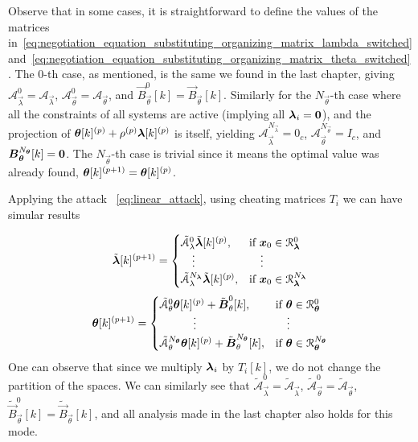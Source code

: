 \documentclass[../main.tex]{subfiles}
\begin{document}
Observe that in some cases, it is straightforward to define the values of the matrices in~\eqref{eq:negotiation_equation_substituting_organizing_matrix_lambda_switched} and~\eqref{eq:negotiation_equation_substituting_organizing_matrix_theta_switched}.
The $0$-th case, as mentioned, is the same we found in the last chapter, giving
$\mathcal{A}_{\vec{\lambda}}^{0}=\mathcal{A}_{\vec{\lambda}}$,
$\mathcal{A}_{\vec{\theta}}^{0}=\mathcal{A}_{\vec{\theta}}$, and
$\vec{B}_{\vec{\theta}}^{0}[k]=\vec{B}_{\vec{\theta}}[k]$.
Similarly for the $N_{\vec{\theta}}$-th case where all the constraints of all systems are active (implying all $\boldsymbol{\lambda}_{i}=\mathbf{0}$), and the projection of $\boldsymbol{\theta}[k]^{(p)}+\rho^{(p)}\boldsymbol{\lambda}[k]^{(p)}$ is itself, yielding
$\mathcal{A}_{\vec{\lambda}}^{N_{\vec{\lambda}}}=0_{c}$,
$\mathcal{A}_{\vec{\theta}}^{N_{\vec{\theta}}}=I_{c}$, and
$\boldsymbol{B}_{\boldsymbol{\theta}}^{N_{\boldsymbol{\theta}}}[k]=\mathbf{0}$.
The $N_{\vec{\theta}}$-th case is trivial since it means the optimal value was already found, $\boldsymbol{\theta}[k]^{(p+1)}=\boldsymbol{\theta}[k]^{(p)}$.

Applying the attack ~\eqref{eq:linear_attack}, using cheating matrices $T_{i}$ we can have simular results

\begin{equation}
  \label{eq:negotiation_equation_substituting_organizing_matrix_lambda_switched_cheating}
  \tilde{\vec{\lambda}}[k]\pplusone=
  \begin{cases}
    \tilde{\mathcal{A}}_{\lambda}^{0}\tilde{\vec{\lambda}}[k]\p,&\text{if}\ \vec{x}_{0}\in\set{R}_{\vec{\lambda}}^{0}\\
    \quad\vdots&\quad\vdots\\
    \tilde{\mathcal{A}}_{\lambda}^{N_{\vec{\lambda}}}\tilde{\vec{\lambda}}[k]\p,&\text{if}\ \vec{x}_{0}\in\set{R}_{\vec{\lambda}}^{N_{\vec{\lambda}}}\\
  \end{cases}
\end{equation}
\begin{equation}
  \label{eq:negotiation_equation_substituting_organizing_matrix_theta_switched_cheating}
  \vec{\theta}[k]\pplusone=
  \begin{cases}
    \tilde{\mathcal{A}}_{\theta}^{0}\vec{\theta}[k]\p+\mathcal{\tilde{\vec{B}}}_{\theta}^{0}[k],&\text{if}\ \vec{\theta}\in\set{R}_{\vec{\theta}}^{0}\\
    \qquad\quad \vdots&\quad \vdots\\
    \tilde{\mathcal{A}}_{\theta}^{N_{\vec{\theta}}}\vec{\theta}[k]\p+\mathcal{\tilde{\vec{B}}}_{\theta}^{N_{\vec{\theta}}}[k],&\text{if}\ \vec{\theta}\in\set{R}_{\vec{\theta}}^{N_{\vec{\theta}}}\\
  \end{cases}
\end{equation}
One can observe that since we multiply $\boldsymbol{\lambda}_{i}$ by $T_{i}[k]$, we do not change the partition of the spaces.
We can similarly see that
$\tilde{\mathcal{A}}_{\vec{\lambda}}^{0}=\tilde{\mathcal{A}}_{\vec{\lambda}}$,
$\tilde{\mathcal{A}}_{\vec{\theta}}^{0}=\tilde{\mathcal{A}}_{\vec{\theta}}$,
$\tilde{\vec{B}}_{\vec{\theta}}^{0}[k]=\tilde{\vec{B}}_{\vec{\theta}}[k]$, and all analysis made in the last chapter also holds for this mode.
\end{document}
